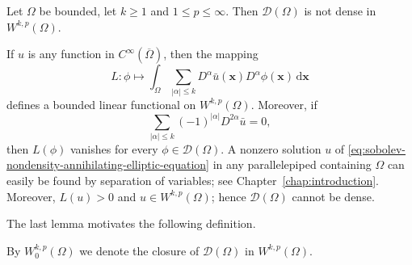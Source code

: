\begin{Lemma}
\label{lem:test-functions-sobolev-nondensity}
Let $\Omega$ be bounded, let $k\geq1$ and $1\leq p\leq\infty$. Then $\mathcal{D}(\Omega)$ is not dense in $W^{k,p}(\Omega)$.
\end{Lemma}

\begin{Proof}
If $u$ is any function in $C^{\infty}(\overline\Omega)$, then the mapping
\begin{equation}\label{eq:sobolev-test-functions-annihilating-functional}
L:\phi\mapsto\int_{\Omega}\sum_{|\alpha|\leq k}D^\alpha\bar u(\bm{x})D^\alpha\phi(\bm{x})\,\mathrm{d}\bm{x}
\end{equation}
defines a bounded linear functional on $W^{k,p}(\Omega)$. Moreover, if
\begin{equation}\label{eq:sobolev-nondensity-annihilating-elliptic-equation}
\sum_{|\alpha|\leq k}(-1)^{|\alpha|}D^{2\alpha}\bar u=0,
\end{equation}
then $L(\phi)$ vanishes for every $\phi\in\mathcal{D}(\Omega)$. A nonzero solution $u$ of \eqref{eq:sobolev-nondensity-annihilating-elliptic-equation} in any parallelepiped containing $\Omega$ can easily be found by separation of variables; see Chapter~\ref{chap:introduction}. Moreover, $L(u)>0$ and $u\in W^{k,p}(\Omega)$; hence $\mathcal{D}(\Omega)$ cannot be dense.
\end{Proof}

The last lemma motivates the following definition.

\begin{Definition}
\label{def:sobolev-test-function-closure}
By $W_0^{k,p}(\Omega)$ we denote the closure of $\mathcal{D}(\Omega)$ in $W^{k,p}(\Omega)$.
\end{Definition}
